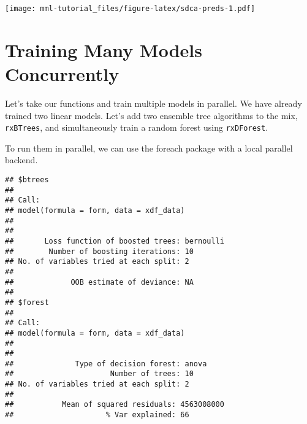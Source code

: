 \documentclass[]{book}
\newenvironment{Shaded}{\begin{snugshade}}{\end{snugshade}}
\newcommand{\KeywordTok}[1]{\textcolor[rgb]{0.13,0.29,0.53}{\textbf{#1}}}
\newcommand{\DataTypeTok}[1]{\textcolor[rgb]{0.13,0.29,0.53}{#1}}
\newcommand{\StringTok}[1]{\textcolor[rgb]{0.31,0.60,0.02}{#1}}
\newcommand{\OperatorTok}[1]{\textcolor[rgb]{0.81,0.36,0.00}{\textbf{#1}}}
\newcommand{\NormalTok}[1]{#1}
\theoremstyle{definition}
\theoremstyle{definition}
\theoremstyle{definition}
\theoremstyle{remark}
\begin{document}
\texttt{[image: mml-tutorial\_files/figure-latex/sdca-preds-1.pdf]}

\section{Training Many Models
Concurrently}\label{training-many-models-concurrently}

Let's take our functions and train multiple models in parallel. We have
already trained two linear models. Let's add two ensemble tree
algorithms to the mix, \texttt{rxBTrees}, and simultaneously train a
random forest using \texttt{rxDForest}.

To run them in parallel, we can use the foreach package with a local
parallel backend.

\begin{Shaded}
\end{Shaded}

\begin{verbatim}
## $btrees
## 
## Call:
## model(formula = form, data = xdf_data)
## 
## 
##       Loss function of boosted trees: bernoulli 
##        Number of boosting iterations: 10 
## No. of variables tried at each split: 2 
## 
##             OOB estimate of deviance: NA 
## 
## $forest
## 
## Call:
## model(formula = form, data = xdf_data)
## 
## 
##              Type of decision forest: anova 
##                      Number of trees: 10 
## No. of variables tried at each split: 2 
## 
##           Mean of squared residuals: 4563008000
##                     % Var explained: 66
\end{verbatim}
\end{document}
